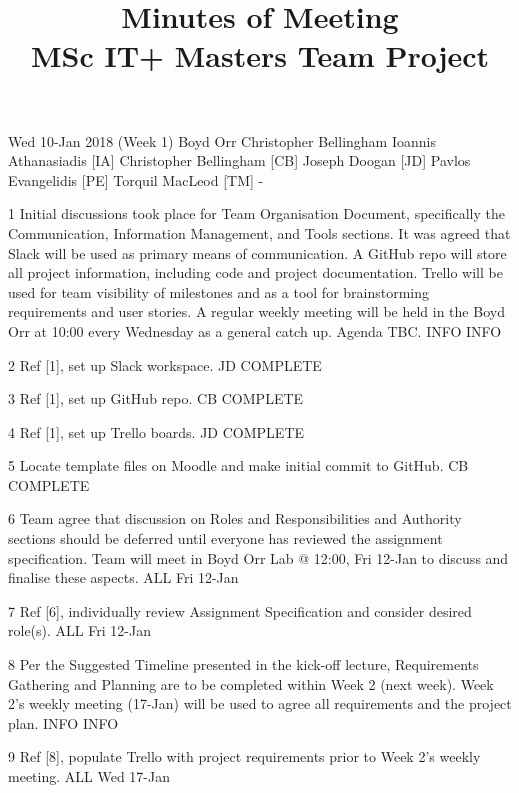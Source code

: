\documentclass[a4paper, 12pt]{article}
\title{Minutes of Meeting \\ MSc IT+ Masters Team Project}
\begin{document}
	\maketitle
	\momtoptable
	{Wed 10-Jan 2018 (Week 1)}
	{Boyd Orr}
	{Christopher Bellingham}
	{Ioannis Athanasiadis [IA]\newline
	Christopher Bellingham [CB]\newline
	Joseph Doogan [JD]\newline
	Pavlos Evangelidis [PE]\newline
	Torquil MacLeod [TM]}
	{-}

	\begin{momitems}
		\momitem
		{1}
		{Initial discussions took place for Team Organisation Document, specifically the Communication, Information Management, and Tools sections. It was agreed that Slack will be used as primary means of communication. A GitHub repo will store all project information, including code and project documentation. Trello will be used for team visibility of milestones and as a tool for brainstorming requirements and user stories. A regular weekly meeting will be held in the Boyd Orr at 10:00 every Wednesday as a general catch up. Agenda TBC.}
		{INFO}
		{INFO}

		\momitem
		{2}
		{Ref [1], set up Slack workspace.}
		{JD}
		{COMPLETE}

		\momitem
		{3}
		{Ref [1], set up GitHub repo.}
		{CB}
		{COMPLETE}

		\momitem
		{4}
		{Ref [1], set up Trello boards.}
		{JD}
		{COMPLETE}

		\momitem
		{5}
		{Locate template files on Moodle and make initial commit to GitHub.}
		{CB}
		{COMPLETE}

		\momitem
		{6}
		{Team agree that discussion on Roles and Responsibilities and Authority sections should be deferred until everyone has reviewed the assignment specification. Team will meet in Boyd Orr Lab @ 12:00, Fri 12-Jan to discuss and finalise these aspects.}
		{ALL}
		{Fri 12-Jan}

		\momitem
		{7}
		{Ref [6], individually review Assignment Specification and consider desired role(s).}
		{ALL}
		{Fri 12-Jan}

		\momitem
		{8}
		{Per the Suggested Timeline presented in the kick-off lecture, Requirements Gathering and Planning are to be completed within Week 2 (next week). Week 2's weekly meeting (17-Jan) will be used to agree all requirements and the project plan.}
		{INFO}
		{INFO}
		
		\momitem
		{9}
		{Ref [8], populate Trello with project requirements prior to Week 2's weekly meeting.}
		{ALL}
		{Wed 17-Jan}
	\end{momitems}
\end{document}
